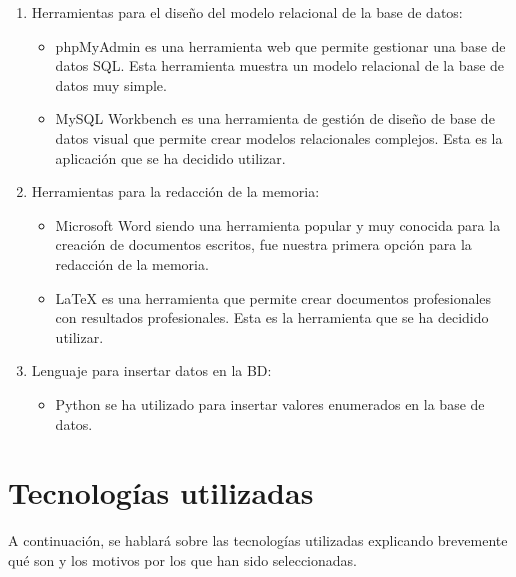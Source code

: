 \documentclass[11pt]{book}
\begin{document}
\begin{enumerate}
		\item Herramientas para el diseño del modelo relacional de la base de datos: 
		\begin{itemize} 
			\item phpMyAdmin es una herramienta web que permite gestionar una base de datos SQL. Esta herramienta muestra un modelo relacional de la base de datos muy simple.
			\item MySQL Workbench es una herramienta de gestión de diseño de base de datos visual que permite crear modelos relacionales complejos. Esta es la aplicación que se ha decidido utilizar.
		\end{itemize}
		\item Herramientas para la redacción de la memoria:
		\begin{itemize} 
			\item Microsoft Word siendo una herramienta popular y muy conocida para la creación de documentos escritos, fue nuestra primera opción para la redacción de la memoria.
			\item LaTeX es una herramienta que permite crear documentos profesionales con resultados profesionales. Esta es la herramienta que se ha decidido utilizar.
		\end{itemize}
		\item Lenguaje para insertar datos en la BD:
		\begin{itemize} 
			\item Python se ha utilizado para insertar valores enumerados en la base de datos.
		\end{itemize}
	\end{enumerate}
	
	\chapter{Tecnologías utilizadas}
	A continuación, se hablará sobre las tecnologías utilizadas explicando brevemente qué son y los motivos por los que han sido seleccionadas.
	
\end{document}

